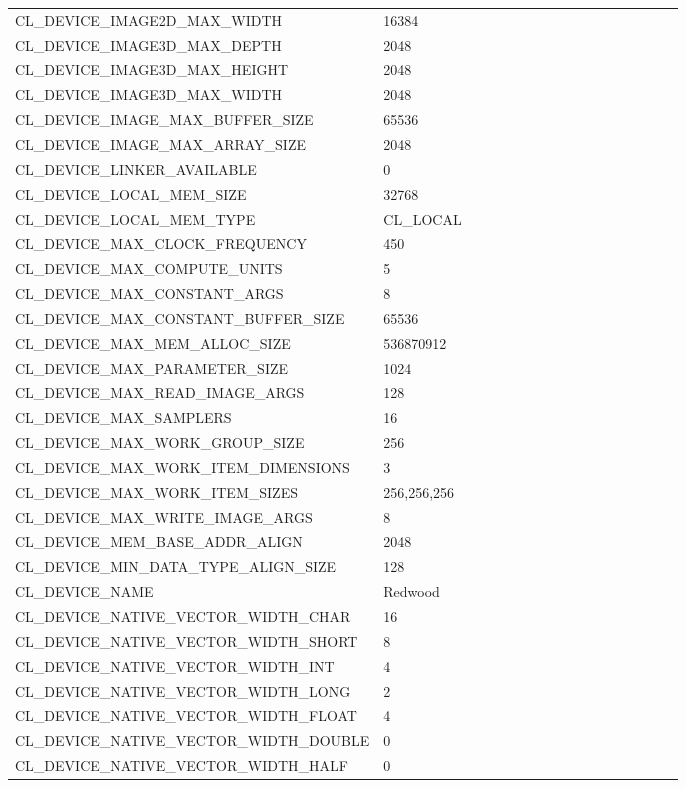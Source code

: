 \begin{longtable}{p{0.55\linewidth} p{0.45\linewidth}}
CL\_DEVICE\_IMAGE2D\_MAX\_WIDTH & 16384 \\
CL\_DEVICE\_IMAGE3D\_MAX\_DEPTH & 2048 \\
CL\_DEVICE\_IMAGE3D\_MAX\_HEIGHT & 2048 \\
CL\_DEVICE\_IMAGE3D\_MAX\_WIDTH & 2048 \\
CL\_DEVICE\_IMAGE\_MAX\_BUFFER\_SIZE & 65536 \\
CL\_DEVICE\_IMAGE\_MAX\_ARRAY\_SIZE & 2048 \\
CL\_DEVICE\_LINKER\_AVAILABLE & 0 \\
CL\_DEVICE\_LOCAL\_MEM\_SIZE & 32768 \\
CL\_DEVICE\_LOCAL\_MEM\_TYPE & CL\_LOCAL \\
CL\_DEVICE\_MAX\_CLOCK\_FREQUENCY & 450 \\
CL\_DEVICE\_MAX\_COMPUTE\_UNITS & 5 \\
CL\_DEVICE\_MAX\_CONSTANT\_ARGS & 8 \\
CL\_DEVICE\_MAX\_CONSTANT\_BUFFER\_SIZE & 65536 \\
CL\_DEVICE\_MAX\_MEM\_ALLOC\_SIZE & 536870912 \\
CL\_DEVICE\_MAX\_PARAMETER\_SIZE & 1024 \\
CL\_DEVICE\_MAX\_READ\_IMAGE\_ARGS & 128 \\
CL\_DEVICE\_MAX\_SAMPLERS & 16 \\
CL\_DEVICE\_MAX\_WORK\_GROUP\_SIZE & 256 \\
CL\_DEVICE\_MAX\_WORK\_ITEM\_DIMENSIONS & 3 \\
CL\_DEVICE\_MAX\_WORK\_ITEM\_SIZES & 256,256,256 \\
CL\_DEVICE\_MAX\_WRITE\_IMAGE\_ARGS & 8 \\
CL\_DEVICE\_MEM\_BASE\_ADDR\_ALIGN & 2048 \\
CL\_DEVICE\_MIN\_DATA\_TYPE\_ALIGN\_SIZE & 128 \\
CL\_DEVICE\_NAME & Redwood \\
CL\_DEVICE\_NATIVE\_VECTOR\_WIDTH\_CHAR & 16 \\
CL\_DEVICE\_NATIVE\_VECTOR\_WIDTH\_SHORT & 8 \\
CL\_DEVICE\_NATIVE\_VECTOR\_WIDTH\_INT & 4 \\
CL\_DEVICE\_NATIVE\_VECTOR\_WIDTH\_LONG & 2 \\
CL\_DEVICE\_NATIVE\_VECTOR\_WIDTH\_FLOAT & 4 \\
CL\_DEVICE\_NATIVE\_VECTOR\_WIDTH\_DOUBLE & 0 \\
CL\_DEVICE\_NATIVE\_VECTOR\_WIDTH\_HALF & 0 \\

\end{longtable}
